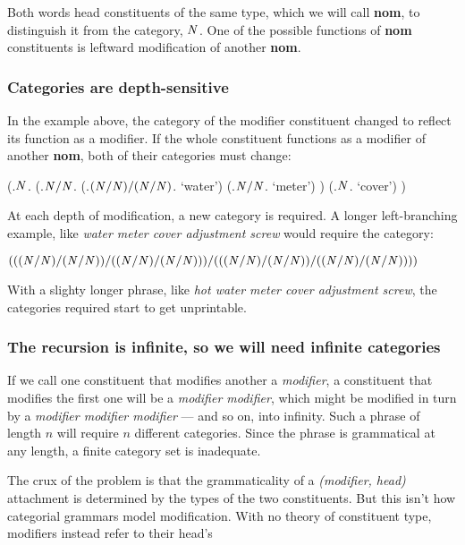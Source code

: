 \documentclass[11pt,twoside,final]{ahudson-harvard}
\newcommand{\cf}[1]{\mbox{$\it{#1}$}}   %
\newcommand{\nom}{\textbf{nom}\xspace}
\begin{document}
Both words head constituents of the same type, which we will call \nom, to distinguish it from the category, \cf{N}. One of the possible functions of \nom constituents is leftward modification of another \nom.

\subsubsection{Categories are depth-sensitive}

In the example above, the category of the modifier constituent changed to reflect its function as a modifier. If the whole constituent functions as a modifier of another \nom, both of their categories must change:

\begin{parsetree}
(.\cf{N}.
  (.\cf{N/N}.
    (.\cf{(N/N)/(N/N)}. `water')
    (.\cf{N/N}.  `meter')
  )
  (.\cf{N}. `cover')
)
\end{parsetree}

At each depth of modification, a new category is required. A longer left-branching example, like \emph{water meter cover adjustment screw} would require the category:

\cf{(((N/N)/(N/N))/((N/N)/(N/N)))/(((N/N)/(N/N))/((N/N)/(N/N))))}

With a slighty longer phrase, like \emph{hot water meter cover adjustment screw}, the categories required start to get unprintable.

\subsubsection{The recursion is infinite, so we will need infinite categories}

If we call one constituent that modifies another a \emph{modifier}, a constituent that modifies the first one will be a \emph{modifier modifier}, which might be modified in turn by a \emph{modifier modifier modifier} --- and so on, into infinity. Such a phrase of length $n$ will require $n$ different categories. Since the phrase is grammatical at any length, a finite category set is inadequate.

The crux of the problem is that the grammaticality of a \emph{(modifier, head)} attachment is determined by the types of the two constituents. But this isn't how categorial grammars model modification. With no theory of constituent type, modifiers instead refer to their head's
\end{document}
